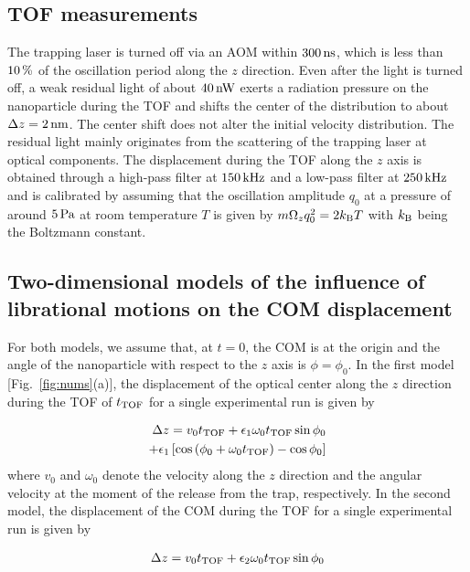 \documentclass[aps, prl, 
amsmath, showpacs, preprintnumbers, twocolumn, amssymb, amsmath, superscriptaddress]{revtex4-1}
\begin{document}
\subsection{TOF measurements}

The trapping laser is turned off via an AOM within $\unit[300]{ns}$, which is less than $\unit[10]{\%}$ of the oscillation period along the $z$ direction. Even after the light is turned off, a weak residual light of about $\unit[40]{nW}$ exerts a radiation pressure on the nanoparticle during the TOF and shifts the center of the distribution to about $\Delta z = \unit[2]{nm}$. The center shift does not alter the initial velocity distribution. The residual light mainly originates from the scattering of the trapping laser at optical components. The displacement during the TOF along the $z$ axis is obtained through a high-pass filter at $\unit[150]{kHz}$ and a low-pass filter at $\unit[250]{kHz}$ and is calibrated by assuming that the oscillation amplitude $q_0$ at a pressure of around $\unit[5]{Pa}$ at room temperature $T$ is given by $m \Omega_z q_0^2=2k_{\rm B}T$ with $k_{\rm B}$ being the Boltzmann constant.

\subsection{Two-dimensional models of the influence of librational motions on the COM displacement }
For both models, we assume that, at $t=0$, the COM is at the origin and the angle of the nanoparticle with respect to the $z$ axis is $\phi=\phi_0$. In the first model [Fig.~\ref{fig:nums}(a)], the displacement of the optical center along the $z$ direction during the TOF of $t_{\rm TOF}$ for a single experimental run is given by 

\begin{align}
\Delta z =  v_0t_{\rm TOF} + \epsilon_1 \omega_0t_{\rm TOF}  \sin \phi_0 \notag \\
+ \epsilon_1 \left[ \cos \left(\phi_0+\omega_0 t_{\rm TOF} \right) - \cos \phi_0 \right]
\end{align}
where $v_0$ and $\omega_0$ denote the velocity along the $z$ direction and the angular velocity at the moment of the release from the trap, respectively. In the second model, the displacement of the COM during the TOF for a single experimental run is given by

\begin{align}
\Delta z =  v_0t_{\rm TOF} + \epsilon_2 \omega_0t_{\rm TOF}  \sin \phi_0 
\end{align}
\end{document}
